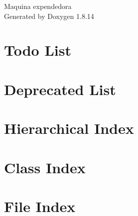 \documentclass[twoside]{book}
\newcommand{\+}{\discretionary{\mbox{\scriptsize$\hookleftarrow$}}{}{}}
\newcommand{\clearemptydoublepage}{%
  \newpage{\pagestyle{empty}\cleardoublepage}%
}
\begin{document}
\hypersetup{pageanchor=false,
             bookmarksnumbered=true,
             pdfencoding=unicode
            }
\begin{titlepage}
\vspace*{7cm}
\begin{center}%
{\Large Maquina expendedora }\\
\vspace*{1cm}
{\large Generated by Doxygen 1.8.14}\\
\end{center}
\end{titlepage}
\clearemptydoublepage
{}
\tableofcontents
\clearemptydoublepage
{}
\hypersetup{pageanchor=true}

\chapter{Todo List}
\label{todo}

\chapter{Deprecated List}
\label{deprecated}

\chapter{Hierarchical Index}

\chapter{Class Index}

\chapter{File Index}

\end{document}
